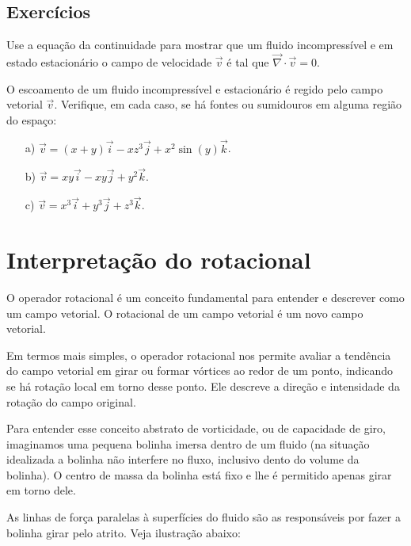 \subsection*{Exercícios}
\begin{exer}
Use a equação da continuidade para mostrar que um fluido incompressível e em estado estacionário o campo de velocidade $\vec{v}$ é tal que $\vec{\nabla}\cdot \vec{v}=0$.
\end{exer}
\begin{exer}
 O escoamento de um fluido incompressível e estacionário é regido pelo campo vetorial $\vec{v}$. Verifique, em cada caso, se há fontes ou sumidouros em alguma região do espaço:
 \begin{itemize}
  \item[a)] $\vec{v}=(x+y)\vec{i}-xz^3\vec{j}+x^2\sin(y)\vec{k}$.
  \item[b)] $\vec{v}=xy\vec{i}-xy\vec{j}+y^2\vec{k}$.
  \item[c)] $\vec{v}=x^3\vec{i}+y^3\vec{j}+z^3\vec{k}$.

  \end{itemize}

\end{exer}



\section{Interpretação do rotacional}
O operador rotacional é um conceito fundamental para entender e descrever como um campo vetorial. O rotacional de um campo vetorial é um novo campo vetorial.

Em termos mais simples, o operador rotacional nos permite avaliar a tendência do campo vetorial em girar ou formar vórtices ao redor de um ponto, indicando se há rotação local em torno desse ponto. Ele descreve a direção e intensidade da rotação do campo original. 

Para entender esse conceito abstrato de vorticidade, ou de capacidade de giro, imaginamos uma pequena bolinha imersa dentro de um fluido (na situação idealizada a bolinha não interfere no fluxo, inclusivo  dento do volume da bolinha). O centro de massa da bolinha está fixo e lhe é permitido apenas girar em torno dele. 

As linhas de força paralelas à superfícies do fluido são as responsáveis por fazer a bolinha girar pelo atrito. Veja ilustração abaixo:

